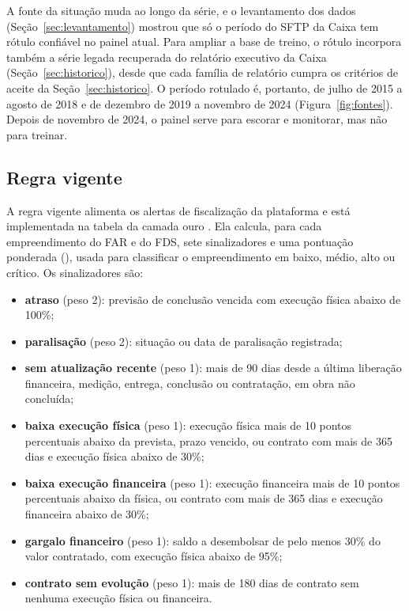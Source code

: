 A fonte da situação muda ao longo da série, e o levantamento dos dados (Seção~\ref{sec:levantamento}) mostrou que só o período do SFTP da Caixa tem rótulo confiável no painel atual. Para ampliar a base de treino, o rótulo incorpora também a série legada recuperada do relatório executivo da Caixa (Seção~\ref{sec:historico}), desde que cada família de relatório cumpra os critérios de aceite da Seção~\ref{sec:historico}. O período rotulado é, portanto, de julho de 2015 a agosto de 2018 e de dezembro de 2019 a novembro de 2024 (Figura~\ref{fig:fontes}). Depois de novembro de 2024, o painel serve para escorar e monitorar, mas não para treinar.

\subsection{Regra vigente}
\label{sec:regra-vigente}

A regra vigente alimenta os alertas de fiscalização da plataforma e está implementada na tabela da camada ouro . Ela calcula, para cada empreendimento do FAR e do FDS, sete sinalizadores e uma pontuação ponderada (), usada para classificar o empreendimento em baixo, médio, alto ou crítico. Os sinalizadores são:

\begin{itemize}
	\item \textbf{atraso} (peso 2): previsão de conclusão vencida com execução física abaixo de 100\%;
	\item \textbf{paralisação} (peso 2): situação ou data de paralisação registrada;
	\item \textbf{sem atualização recente} (peso 1): mais de 90 dias desde a última liberação financeira, medição, entrega, conclusão ou contratação, em obra não concluída;
	\item \textbf{baixa execução física} (peso 1): execução física mais de 10 pontos percentuais abaixo da prevista, prazo vencido, ou contrato com mais de 365 dias e execução física abaixo de 30\%;
	\item \textbf{baixa execução financeira} (peso 1): execução financeira mais de 10 pontos percentuais abaixo da física, ou contrato com mais de 365 dias e execução financeira abaixo de 30\%;
	\item \textbf{gargalo financeiro} (peso 1): saldo a desembolsar de pelo menos 30\% do valor contratado, com execução física abaixo de 95\%;
	\item \textbf{contrato sem evolução} (peso 1): mais de 180 dias de contrato sem nenhuma execução física ou financeira.
\end{itemize}

